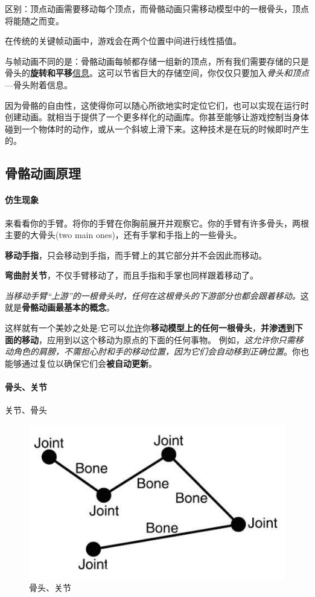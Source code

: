 \documentclass[UTF8,a4paper,12pt]{ctexbook}
\begin{document}
				区别：顶点动画需要移动每个顶点，而骨骼动画只需移动模型中的一根骨头，顶点将能随之而变。
				
				在传统的关键帧动画中，游戏会在两个位置中间进行线性插值。
				
				与帧动画不同的是：骨骼动画每帧都存储一组新的顶点，所有我们需要存储的只是骨头的\textbf{旋转和平移}\underline{信息}。这可以节省巨大的存储空间，你仅仅只要加入\textit{骨头和顶点}—骨头附着信息。
				
				因为骨骼的自由性，这使得你可以随心所欲地实时定位它们，也可以实现在运行时创建动画。就相当于提供了一个更多样化的动画库。你甚至能够让游戏控制当身体碰到一个物体时的动作，或从一个斜坡上滑下来。这种技术是在玩的时候即时产生的。

		\subsection{骨骼动画原理}
			\paragraph{仿生现象}
				来看看你的手臂。将你的手臂在你胸前展开并观察它。你的手臂有许多骨头，两根主要的大骨头(two main ones)，还有手掌和手指上的一些骨头。
				
				\textbf{移动手指}，只会移动到手指，而手臂上的其它部分并不会因此而移动。
				
				\textbf{弯曲肘关节}，不仅手臂移动了，而且手指和手掌也同样跟着移动了。
				
				\textit{当移动手臂“上游”的一根骨头时，任何在这根骨头的下游部分也都会跟着移动。}这就是\textbf{骨骼动画最基本的概念}。
				
				这样就有一个美妙之处是:它可以\underline{允许}你\textbf{移动模型上的任何一根骨头}，\textbf{并渗透到下面的移动}，应用到以这个移动为原点的下面的任何事物。 例如，\textit{这允许你只需移动角色的肩膀，不需担心肘和手的移动位置，因为它们会自动移到正确位置}。你也能够通过复位以确保它们会\textbf{被自动更新}。
				
			\paragraph{骨头、关节}
				关节、骨头
				
				\begin{figure}[H]
					\centering
					\includegraphics[width=.6\linewidth]{SkeletonTheory01}
					\caption{骨头、关节}
				\end{figure}
				
\end{document}
